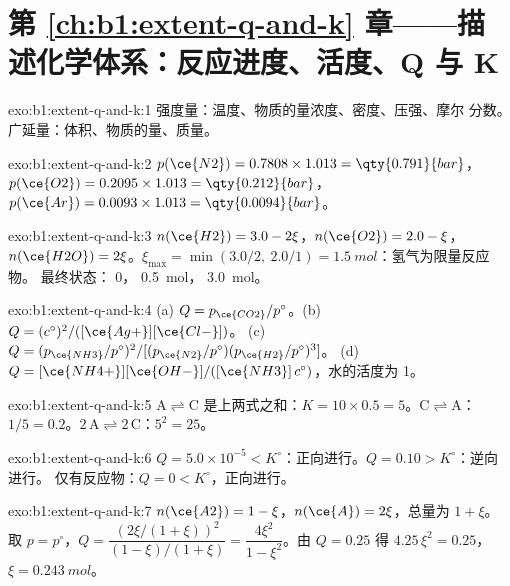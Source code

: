 \section*{第 \ref{ch:b1:extent-q-and-k} 章——描述化学体系：反应进度、活度、Q 与 K}

\begin{solution}{exo:b1:extent-q-and-k:1}
强度量：温度、物质的量浓度、密度、压强、摩尔
分数。广延量：体积、物质的量、质量。
\end{solution}

\begin{solution}{exo:b1:extent-q-and-k:2}
$p(\ce{N2}) = 0.7808 \times 1.013 = \qty{0.791}{bar}$，$p(\ce{O2}) =
0.2095 \times 1.013 = \qty{0.212}{bar}$，$p(\ce{Ar}) = 0.0093 \times 1.013
= \qty{0.0094}{bar}$。
\end{solution}

\begin{solution}{exo:b1:extent-q-and-k:3}
$n(\ce{H2}) = 3.0 - 2\xi$，$n(\ce{O2}) = 2.0 - \xi$，$n(\ce{H2O}) =
2\xi$。$\xi_{\max} = \min(3.0/2,\ 2.0/1) = \qty{1.5}{mol}$：氢气为限量反应物。
最终状态： 0， \qty{0.5}{mol}，
\qty{3.0}{mol}。
\end{solution}

\begin{solution}{exo:b1:extent-q-and-k:4}
(a) $Q = p_{\ce{CO2}}/p^\circ$。(b) $Q = (c^\circ)^2/([\ce{Ag+}][\ce{Cl-}])$。
(c) $Q = (p_{\ce{NH3}}/p^\circ)^2/[(p_{\ce{N2}}/p^\circ)(p_{\ce{H2}}/p^\circ)^3]$。
(d) $Q = [\ce{NH4+}][\ce{OH-}]/([\ce{NH3}]\,c^\circ)$，水的活度为 1。
\end{solution}

\begin{solution}{exo:b1:extent-q-and-k:5}
$\mathrm{A \rightleftharpoons C}$ 是上两式之和：$K = 10 \times 0.5 = 5$。$\mathrm{C \rightleftharpoons A}$：$1/5 =
0.2$。$\mathrm{2\,A \rightleftharpoons 2\,C}$：$5^2 = 25$。
\end{solution}

\begin{solution}{exo:b1:extent-q-and-k:6}
$Q = 5.0 \times 10^{-5} < K^\circ$：正向进行。$Q = 0.10 > K^\circ$：逆向进行。
仅有反应物：$Q = 0 < K^\circ$，正向进行。
\end{solution}

\begin{solution}{exo:b1:extent-q-and-k:7}
$n(\ce{A2}) = 1 - \xi$，$n(\ce{A}) = 2\xi$，总量为 $1 + \xi$。取 $p =
p^\circ$，$Q = \dfrac{(2\xi/(1+\xi))^2}{(1-\xi)/(1+\xi)} = \dfrac{4\xi^2}{1 -
\xi^2}$。由 $Q = 0.25$ 得 $4.25\,\xi^2 = 0.25$，$\xi = \qty{0.243}{mol}$。
\end{solution}

